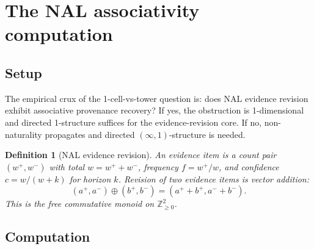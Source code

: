 \documentclass[11pt]{article}
\newtheorem{definition}{Definition}
\begin{document}
\section{The NAL associativity computation}
\label{sec:nal-test}

\subsection{Setup}

The empirical crux of the 1-cell-vs-tower question is: does NAL evidence revision exhibit
associative provenance recovery? If yes, the obstruction is 1-dimensional and directed
1-structure suffices for the evidence-revision core. If no, non-naturality propagates and
directed $(\infty,1)$-structure is needed.

\begin{definition}[NAL evidence revision]
\label{def:nal-rev}
An evidence item is a count pair $(w^+, w^-)$ with total $w = w^+ + w^-$, frequency
$f = w^+/w$, and confidence $c = w/(w+k)$ for horizon $k$. Revision of two evidence items
is vector addition:
\[
(a^+, a^-) \oplus (b^+, b^-) = (a^+ + b^+, a^- + b^-).
\]
This is the free commutative monoid on $\mathbb{Z}_{\geq 0}^2$.
\end{definition}

\subsection{Computation}
\end{document}
